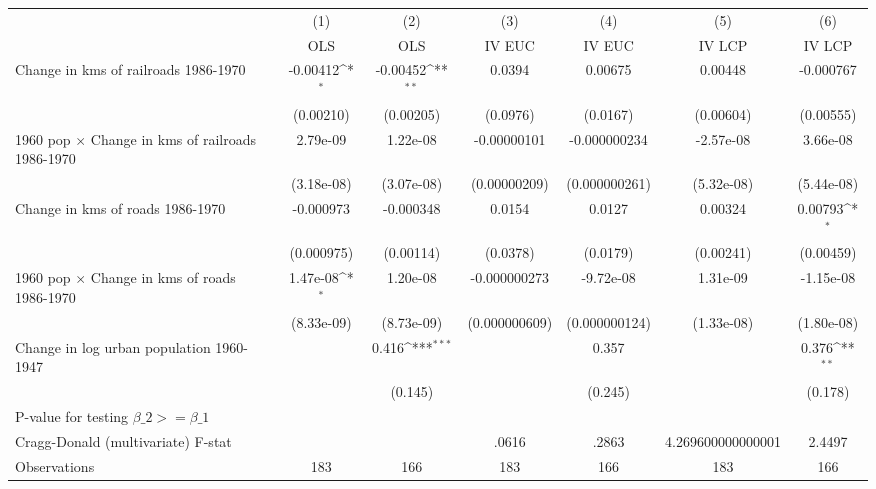 {
\def\sym#1{\ifmmode^{#1}\else\(^{#1}\)\fi}
\begin{tabular}{l*{6}{c}}
\hline\hline
                &\multicolumn{1}{c}{(1)}&\multicolumn{1}{c}{(2)}&\multicolumn{1}{c}{(3)}&\multicolumn{1}{c}{(4)}&\multicolumn{1}{c}{(5)}&\multicolumn{1}{c}{(6)}\\
                &\multicolumn{1}{c}{OLS}&\multicolumn{1}{c}{OLS}&\multicolumn{1}{c}{IV EUC}&\multicolumn{1}{c}{IV EUC}&\multicolumn{1}{c}{IV LCP}&\multicolumn{1}{c}{IV LCP}\\
\hline
Change in kms of railroads 1986-1970& -0.00412\sym{*}  & -0.00452\sym{**} &   0.0394         &  0.00675         &  0.00448         &-0.000767         \\
                &(0.00210)         &(0.00205)         & (0.0976)         & (0.0167)         &(0.00604)         &(0.00555)         \\
[1em]
1960 pop $\times$ Change in kms of railroads 1986-1970& 2.79e-09         & 1.22e-08         &-0.00000101         &-0.000000234         &-2.57e-08         & 3.66e-08         \\
                &(3.18e-08)         &(3.07e-08)         &(0.00000209)         &(0.000000261)         &(5.32e-08)         &(5.44e-08)         \\
[1em]
Change in kms of roads 1986-1970&-0.000973         &-0.000348         &   0.0154         &   0.0127         &  0.00324         &  0.00793\sym{*}  \\
                &(0.000975)         &(0.00114)         & (0.0378)         & (0.0179)         &(0.00241)         &(0.00459)         \\
[1em]
1960 pop $\times$ Change in kms of roads 1986-1970& 1.47e-08\sym{*}  & 1.20e-08         &-0.000000273         &-9.72e-08         & 1.31e-09         &-1.15e-08         \\
                &(8.33e-09)         &(8.73e-09)         &(0.000000609)         &(0.000000124)         &(1.33e-08)         &(1.80e-08)         \\
[1em]
Change in log urban population 1960-1947&                  &    0.416\sym{***}&                  &    0.357         &                  &    0.376\sym{**} \\
                &                  &  (0.145)         &                  &  (0.245)         &                  &  (0.178)         \\
\hline
P-value for testing $\beta\_{2} >= \beta\_{1}$&                  &                  &                  &                  &                  &                  \\
Cragg-Donald (multivariate) F-stat&                  &                  &    .0616         &    .2863         &4.269600000000001         &   2.4497         \\
Observations    &      183         &      166         &      183         &      166         &      183         &      166         \\
\hline\hline
\end{tabular}
}
